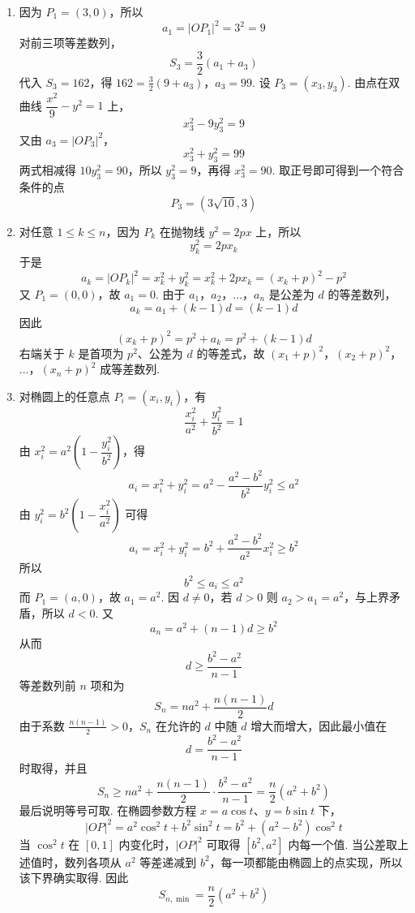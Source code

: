 \begin{solution}
\begin{enumerate}
\item 因为 \(P_1=(3,0)\)，所以
\[
a_1=|OP_1|^2=3^2=9
\]
对前三项等差数列，
\[
S_3=\frac32(a_1+a_3)
\]
代入 \(S_3=162\)，得
\(162=\frac32(9+a_3)\)，\(a_3=99\).
设 \(P_3=(x_3,y_3)\). 由点在双曲线 \(\dfrac{x^2}{9}-y^2=1\) 上，
\[
x_3^2-9y_3^2=9
\]
又由 \(a_3=|OP_3|^2\)，
\[
x_3^2+y_3^2=99
\]
两式相减得 \(10y_3^2=90\)，所以 \(y_3^2=9\)，再得 \(x_3^2=90\). 取正号即可得到一个符合条件的点
\[
P_3=(3\sqrt{10},3)
\]

\item 对任意 \(1\leqslant k\leqslant n\)，因为 \(P_k\) 在抛物线 \(y^2=2px\) 上，所以
\[
y_k^2=2px_k
\]
于是
\[
a_k=|OP_k|^2=x_k^2+y_k^2=x_k^2+2px_k=(x_k+p)^2-p^2
\]
又 \(P_1=(0,0)\)，故 \(a_1=0\). 由于 \(a_1\)，\(a_2\)，\(\ldots\)，\(a_n\) 是公差为 \(d\) 的等差数列，
\[
a_k=a_1+(k-1)d=(k-1)d
\]
因此
\[
(x_k+p)^2=p^2+a_k=p^2+(k-1)d
\]
右端关于 \(k\) 是首项为 \(p^2\)、公差为 \(d\) 的等差式，故
\((x_1+p)^2\)，\((x_2+p)^2\)，\(\ldots\)，\((x_n+p)^2\) 成等差数列.

\item 对椭圆上的任意点 \(P_i=(x_i,y_i)\)，有
\[
\frac{x_i^2}{a^2}+\frac{y_i^2}{b^2}=1
\]
由 \(x_i^2=a^2\left(1-\dfrac{y_i^2}{b^2}\right)\)，得
\[
a_i=x_i^2+y_i^2
=a^2-\frac{a^2-b^2}{b^2}y_i^2\leqslant a^2
\]
由 \(y_i^2=b^2\left(1-\dfrac{x_i^2}{a^2}\right)\) 可得
\[
a_i=x_i^2+y_i^2=b^2+\frac{a^2-b^2}{a^2}x_i^2\geqslant b^2
\]
所以
\[
b^2\leqslant a_i\leqslant a^2
\]
而 \(P_1=(a,0)\)，故 \(a_1=a^2\). 因 \(d\ne0\)，若 \(d>0\) 则 \(a_2>a_1=a^2\)，与上界矛盾，所以 \(d<0\). 又
\[
a_n=a^2+(n-1)d\geqslant b^2
\]
从而
\[
d\geqslant\frac{b^2-a^2}{n-1}
\]
等差数列前 \(n\) 项和为
\[
S_n=na^2+\frac{n(n-1)}2d
\]
由于系数 \(\frac{n(n-1)}2>0\)，\(S_n\) 在允许的 \(d\) 中随 \(d\) 增大而增大，因此最小值在
\[
d=\frac{b^2-a^2}{n-1}
\]
时取得，并且
\[
S_n\geqslant na^2+\frac{n(n-1)}2\cdot\frac{b^2-a^2}{n-1}
=\frac n2(a^2+b^2)
\]
最后说明等号可取. 在椭圆参数方程 \(x=a\cos t\)、\(y=b\sin t\) 下，
\[
|OP|^2=a^2\cos^2t+b^2\sin^2t
=b^2+(a^2-b^2)\cos^2t
\]
当 \(\cos^2t\) 在 \([0,1]\) 内变化时，\(|OP|^2\) 可取得 \([b^2,a^2]\) 内每一个值. 当公差取上述值时，数列各项从 \(a^2\) 等差递减到 \(b^2\)，每一项都能由椭圆上的点实现，所以该下界确实取得. 因此
\[
\boxed{S_{n,\min}=\frac n2(a^2+b^2)}
\]
\end{enumerate}
\end{solution}
